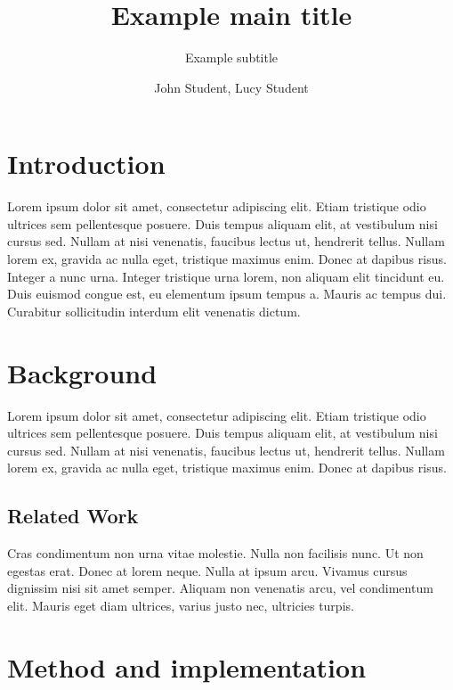 \documentclass[11pt, a4paper]{resources/JTH}
\title{Example main title}
\subtitle{Example subtitle}
\author{John Student, Lucy Student}
\begin{document}
\maketitle


\begingroup
    \setlength{\parskip}{0pt} %
    \tableofcontents
\endgroup

\newpage


\section{Introduction}
    Lorem ipsum \textcite{Breiman_1996} dolor sit amet, consectetur adipiscing elit. Etiam tristique odio ultrices sem pellentesque posuere. Duis tempus aliquam elit, at vestibulum nisi cursus sed. Nullam at nisi venenatis, faucibus lectus ut, hendrerit tellus. Nullam lorem ex, gravida ac nulla eget, tristique maximus enim. Donec at dapibus risus. Integer a nunc urna. Integer tristique urna lorem, non aliquam elit tincidunt eu. Duis euismod congue est, eu elementum ipsum tempus a. Mauris ac tempus dui. Curabitur sollicitudin interdum elit venenatis dictum. \parencite{davidson1996c}

\section{Background}
    
    Lorem ipsum dolor sit amet, consectetur adipiscing elit. Etiam tristique odio ultrices sem pellentesque posuere. Duis tempus aliquam elit, at vestibulum nisi cursus sed. Nullam at nisi venenatis, faucibus lectus ut, hendrerit tellus. Nullam lorem ex, gravida ac nulla eget, tristique maximus enim. Donec at dapibus risus. \parencite{freeman2002example}

    \subsection{Related Work}

        Cras condimentum non urna vitae molestie. Nulla non facilisis nunc. Ut non egestas erat. Donec at lorem neque. Nulla at ipsum arcu. Vivamus cursus dignissim nisi sit amet semper. Aliquam non venenatis arcu, vel condimentum elit. Mauris eget diam ultrices, varius justo nec, ultricies turpis. \parencite{zloof1977query}

\section{Method and implementation}
\end{document}
